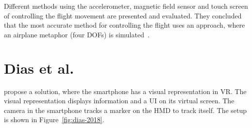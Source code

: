 Different methods using the accelerometer, magnetic field sensor and touch screen of controlling the flight movement are presented and evaluated. They concluded that the most accurate method for controlling the flight uses an approach, where an airplane metaphor (four \acp{DOF}) is simulated~\cite{Benzina.2011}.


\section{Dias et al.}\label{section:dias-2018}
\citeauthor{Dias.2018} propose a solution, where the smartphone has a visual representation in \ac{VR}. The visual representation displays information and a \ac{UI} on its virtual screen. The camera in the smartphone tracks a marker on the \ac{HMD} to track itself. The setup is shown in Figure~\ref{fig:dias-2018}. 

